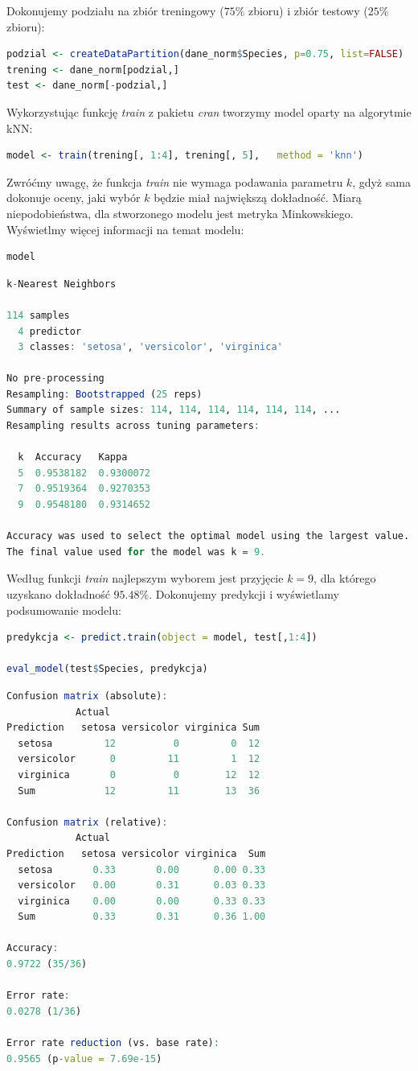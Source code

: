 \documentclass[a4paper]{article}
\begin{document}
Dokonujemy podziału na zbiór treningowy ($75\%$ zbioru) i zbiór testowy ($25\%$ zbioru):
\begin{lstlisting}[language=R,frame=single]
podzial <- createDataPartition(dane_norm$Species, p=0.75, list=FALSE)
trening <- dane_norm[podzial,]
test <- dane_norm[-podzial,]
\end{lstlisting}
\indent Wykorzystując funkcję \textit{train} z pakietu \textit{cran} tworzymy model oparty na algorytmie kNN:
\begin{lstlisting}[language=R,frame=single]
model <- train(trening[, 1:4], trening[, 5],   method = 'knn')
\end{lstlisting}
Zwróćmy uwagę, że funkcja \textit{train} nie wymaga podawania parametru $k$, gdyż sama dokonuje oceny, jaki wybór $k$ będzie miał największą dokładność. Miarą niepodobieństwa, dla stworzonego modelu jest metryka Minkowskiego. Wyświetlmy więcej informacji na temat modelu:
\begin{lstlisting}[language=R,frame=single]
model
\end{lstlisting}
\begin{lstlisting}[language=R,frame=single]
k-Nearest Neighbors 

114 samples
  4 predictor
  3 classes: 'setosa', 'versicolor', 'virginica' 

No pre-processing
Resampling: Bootstrapped (25 reps) 
Summary of sample sizes: 114, 114, 114, 114, 114, 114, ... 
Resampling results across tuning parameters:

  k  Accuracy   Kappa    
  5  0.9538182  0.9300072
  7  0.9519364  0.9270353
  9  0.9548180  0.9314652

Accuracy was used to select the optimal model using the largest value.
The final value used for the model was k = 9.
\end{lstlisting}
Według funkcji \textit{train} najlepszym wyborem jest przyjęcie $k=9$, dla którego uzyskano dokładność $95.48\%$.\newpage
Dokonujemy predykcji i wyświetlamy podsumowanie modelu:
\begin{lstlisting}[language=R,frame=single]
predykcja <- predict.train(object = model, test[,1:4])

eval_model(test$Species, predykcja)
\end{lstlisting}
\begin{lstlisting}[language=R,frame=single]
Confusion matrix (absolute):
            Actual
Prediction   setosa versicolor virginica Sum
  setosa         12          0         0  12
  versicolor      0         11         1  12
  virginica       0          0        12  12
  Sum            12         11        13  36

Confusion matrix (relative):
            Actual
Prediction   setosa versicolor virginica  Sum
  setosa       0.33       0.00      0.00 0.33
  versicolor   0.00       0.31      0.03 0.33
  virginica    0.00       0.00      0.33 0.33
  Sum          0.33       0.31      0.36 1.00

Accuracy:
0.9722 (35/36)

Error rate:
0.0278 (1/36)

Error rate reduction (vs. base rate):
0.9565 (p-value = 7.69e-15)
\end{lstlisting}
\end{document}

